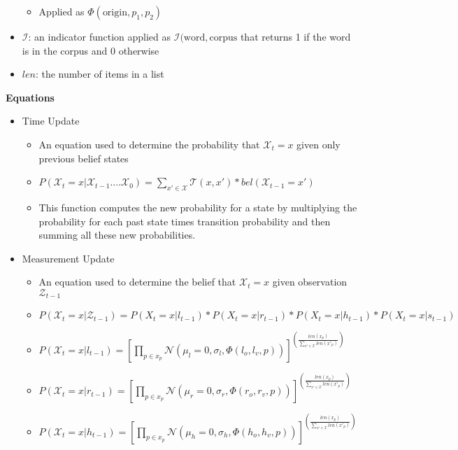 \documentclass[12pt,letterpaper]{article}
\begin{document}
\begin{itemize}
	\begin{itemize}
	\item{Applied as $\Phi(\text{origin}, p_1, p_2)$}
	\end{itemize}
\item{$\mathcal{I}$: an indicator function applied as $\mathcal{I}(\text{word}, \text{corpus}$ that returns 1 if the word is in the corpus and 0 otherwise}
\item{$len$: the number of items in a list}
\end{itemize}
\textbf{Equations}
\begin{itemize}
\item{Time Update}
	\begin{itemize}
	\item{An equation used to determine the probability that $\mathcal{X}_t = x$ given only previous belief states}
	\item{$P(\mathcal{X}_t = x | \mathcal{X}_{t-1} .... \mathcal{X}_0) =\displaystyle\sum_{x' \in \mathcal{X}} \mathcal{T}(x, x')*bel(\mathcal{X}_{t-1} = x')$}
	\item{This function computes the new probability for a state by multiplying the probability for each past state times  transition probability and then summing all these new probabilities.}
	\end{itemize}
\item{Measurement Update}
	\begin{itemize}
	\item{An equation used to determine the belief that $\mathcal{X}_t = x$ given observation $\mathcal{Z}_{t-1}$}
	\item{$P(\mathcal{X}_t=x | \mathcal{Z}_{t-1}) = P(X_t=x | l_{t-1})*P(X_t=x | r_{t-1})*P(X_t=x |h_{t-1})*P(X_t=x | s_{t-1})$}
	\item{$P(\mathcal{X}_t=x|l_{t-1}) = [\displaystyle \prod_{p \in x_p} \mathcal{N}(\mu_l=0, \sigma_l, \Phi(l_o,l_v, p))]^{(\frac{len(x_p)}{\sum_{x'\in\mathcal{X}} len(x'_p)})}$\\}
	\item{$P(\mathcal{X}_t=x|r_{t-1}) = [\displaystyle \prod_{p \in x_p} \mathcal{N}(\mu_r=0, \sigma_r, \Phi(r_o,r_v, p))]^{(\frac{len(x_p)}{\sum_{x'\in\mathcal{X}} len(x'_p)})}$\\}
	\item{$P(\mathcal{X}_t=x|h_{t-1}) = [\displaystyle \prod_{p \in x_p} \mathcal{N}(\mu_h=0, \sigma_h, \Phi(h_o,h_v, p))]^{(\frac{len(x_p)}{\sum_{x'\in\mathcal{X}} len(x'_p)})}$\\}

\end{itemize}
\end{itemize}
\end{document}
